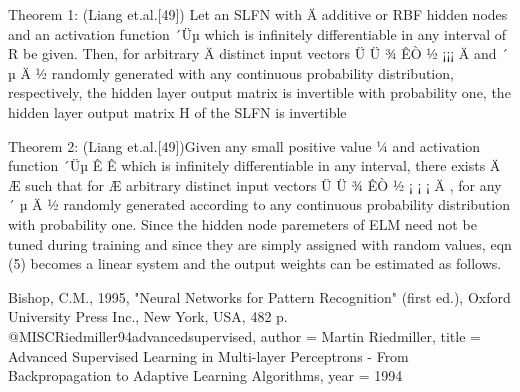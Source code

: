 \documentclass[
	article,			%
	11pt,				%
	oneside,			%
	a4paper,			%
	english,			%
	brazil,				%
	sumario=tradicional
	]{abntex2}
\begin{document}
   Theorem 1: (Liang et.al.[49]) Let an SLFN with Ä additive or RBF hidden
nodes and an activation function ´Üµ which is infinitely differentiable in any
interval of R be given. Then, for arbitrary Ä distinct input vectors Ü Ü ¾
ÊÒ        ½ ¡¡¡ Ä      and ´       µ Ä ½ randomly generated with any continuous
probability distribution, respectively, the hidden layer output matrix is invertible
with probability one, the hidden layer output matrix H of the SLFN is invertible

   Theorem 2: (Liang et.al.[49])Given any small positive value               ¼ and
activation function ´Üµ        Ê      Ê which is infinitely differentiable in any
interval, there exists Ä      Æ such that for Æ arbitrary distinct input vectors
 Ü Ü ¾ ÊÒ         ½ ¡ ¡ ¡ Ä , for any ´      µ Ä ½ randomly generated according to
any continuous probability distribution    with probability
one.
   Since the hidden node paremeters of ELM need not be tuned during training
and since they are simply assigned with random values, eqn (5) becomes a linear
system and the output weights can be estimated as follows.

% 


\begin{citacao}

\end{citacao}




Bishop, C.M., 1995, "Neural Networks for Pattern Recognition" (first ed.),
Oxford University Press Inc., New York, USA, 482 p.
 @MISC{Riedmiller94advancedsupervised,
    author = {Martin Riedmiller},
    title = {Advanced Supervised Learning in Multi-layer Perceptrons - From Backpropagation to Adaptive Learning Algorithms},
    year = {1994}
}

 
%
%
\end{document}
